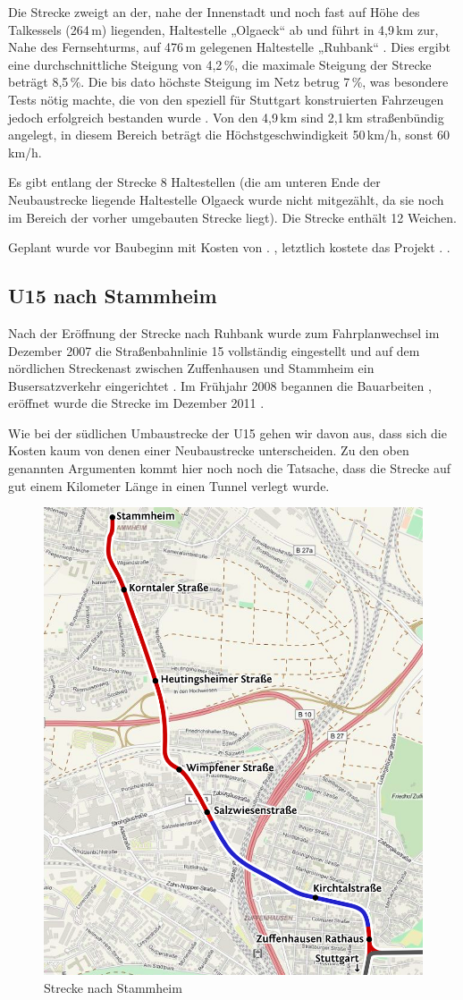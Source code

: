 Die Strecke zweigt an der, nahe der Innenstadt und noch fast auf Höhe des
Talkessels (264\,m) liegenden, Haltestelle „Olgaeck“ ab und führt in 4,9\,km
zur, Nahe des Fernsehturms, auf 476\,m gelegenen Haltestelle „Ruhbank“
\cite{u15vorinfo}. Dies ergibt eine durchschnittliche Steigung von 4,2\,\%,
die maximale Steigung der Strecke beträgt 8,5\,\%. Die bis dato höchste
Steigung im Netz betrug 7\,\%, was besondere Tests nötig machte, die von den
speziell für Stuttgart konstruierten Fahrzeugen jedoch erfolgreich bestanden
wurde \cite{u15vorinfo}. Von den 4,9\,km sind 2,1\,km straßenbündig
angelegt, in diesem Bereich beträgt die Höchstgeschwindigkeit 50\,km/h, sonst
60\,km/h.

Es gibt entlang der Strecke 8 Haltestellen \cite{u15splan} (die am unteren Ende
der Neubaustrecke liegende Haltestelle Olgaeck wurde nicht mitgezählt, da sie
noch im Bereich der vorher umgebauten Strecke liegt). Die Strecke enthält 12
Weichen.

Geplant wurde vor Baubeginn mit Kosten von . \cite{u15vorinfo},
letztlich kostete das Projekt . \cite{u15seb}.

\subsection*{U15 nach Stammheim}

Nach der Eröffnung der Strecke nach Ruhbank wurde zum Fahrplanwechsel im
Dezember 2007 die Straßenbahnlinie 15 vollständig eingestellt und auf dem
nördlichen Streckenast zwischen Zuffenhausen und Stammheim ein Busersatzverkehr
eingerichtet \cite{u15sv}.  Im Frühjahr 2008 begannen die Bauarbeiten
\cite{u15seb}, eröffnet wurde die Strecke im Dezember 2011 \cite{u15sv}.

Wie bei der südlichen Umbaustrecke der U15 gehen wir davon aus, dass sich die
Kosten kaum von denen einer Neubaustrecke unterscheiden. Zu den oben genannten
Argumenten kommt hier noch noch die Tatsache, dass die Strecke auf gut einem
Kilometer Länge in einen Tunnel verlegt wurde.

\begin{figure}
  \includegraphics[width=.5\textwidth]{maps/Stuttgart.png}
  \caption{Strecke nach Stammheim}
\end{figure}

